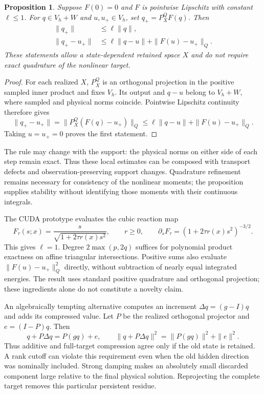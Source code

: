 \documentclass[10pt,a4paper]{article}
\newtheorem{proposition}{Proposition}
\newcommand{\V}{V_h}
\begin{document}
\begin{proposition}\label{prop:quadrature}
Suppose $F(0)=0$ and $F$ is pointwise Lipschitz with constant
$\ell\leq1$. For $q\in\V+W$ and $u,u_+\in\V$, set
$q_+=P_X^QF(q)$. Then
\begin{align}
 \|q_+\|&\leq\ell\|q\|,\\
 \|q_+-u_+\|&\leq\ell\|q-u\|
                 +\|F(u)-u_+\|_Q.\label{eq:quadrature-bound}
\end{align}
These statements allow a state-dependent retained space $X$ and do
not require exact quadrature of the nonlinear target.
\end{proposition}
\begin{proof}
For each realized $X$, $P_X^Q$ is an orthogonal projection in the
positive sampled inner product and fixes $\V$. Its output and
$q-u$ belong to $\V+W$, where sampled and physical norms coincide.
Pointwise Lipschitz continuity therefore gives
\[
 \|q_+-u_+\|=\|P_X^Q(F(q)-u_+)\|_Q
 \leq\ell\|q-u\|+\|F(u)-u_+\|_Q.
\]
Taking $u=u_+=0$ proves the first statement.
\end{proof}
The rule may change with the support: the physical norms on either
side of each step remain exact. Thus these local estimates can be
composed with transport defects and observation-preserving support
changes. Quadrature refinement remains necessary for consistency of
the nonlinear moments; the proposition supplies stability without
identifying those moments with their continuous integrals.

The CUDA prototype evaluates the cubic reaction map
\[
 F_\tau(s;x)=\frac{s}{\sqrt{1+2\tau r(x)s^2}},\qquad r\geq0,
 \qquad \partial_s F_\tau=(1+2\tau r(x)s^2)^{-3/2}.
\]
This gives $\ell=1$. Degree $2\max(p,2q)$ suffices for polynomial
product exactness on affine triangular intersections. Positive sums
also evaluate $\|F(u)-u_+\|_Q^2$ directly, without subtraction of
nearly equal integrated energies. The result uses standard positive
quadrature and orthogonal projection; these ingredients alone do not
constitute a novelty claim.

An algebraically tempting alternative computes an increment
$\Delta q=(g-I)q$ and adds its compressed value. Let $P$ be the
realized orthogonal projector and $e=(I-P)q$. Then
\begin{equation}\label{eq:increment}
 q+P\Delta q=P(gq)+e,\qquad
 \|q+P\Delta q\|^2=\|P(gq)\|^2+\|e\|^2.
\end{equation}
Thus additive and full-target compression agree only if the old state
is retained. A rank cutoff can violate this requirement even when
the old hidden direction was nominally included. Strong damping makes
an absolutely small discarded component large relative to the final
physical solution. Reprojecting the complete target removes this
particular persistent residue.
\end{document}
